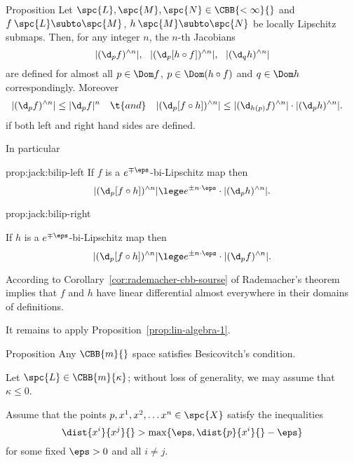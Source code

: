 \begin{thm}{Proposition}\label{prop:jack}
Let 
$\spc{L},\spc{M},\spc{N}\in\CBB{<\infty}{}$ and $f\:\spc{L}\subto\spc{M}$, $h\: \spc{M}\subto\spc{N}$
be locally Lipschitz submaps.
Then, for any integer $n$, 
the $n$-th Jacobians 
$$|(\d_p f)^{\wedge n}|,\ \  
|(\d_p [h\circ f])^{\wedge n}|,\ \  
|(\d_q h)^{\wedge n}|$$
are defined for almost all $p\in\Dom f$, $p\in\Dom (h\circ f)$ and $q\in\Dom h$ correspondingly. 
Moreover
\begin{align*}
|(\d_pf)^{\wedge n}|&\le|\d_pf|^n
& &\t{and}
&
|(\d_p[f\circ h])^{\wedge n}|
&\le|(\d_{h(p)}f)^{\wedge n}|\cdot|(\d_ph)^{\wedge n}|.
\end{align*}
if both left and right hand sides are defined.

In particular
\begin{subthm}{prop:jack:bilip-left}
If $f$ is a $e^{\mp\eps}$-bi-Lipschitz map then
\[ 
|(\d_p[f\circ h])^{\wedge n}|
\lege 
e^{\pm n\cdot\eps}\cdot|(\d_ph)^{\wedge n}|.\]
\end{subthm}
\begin{subthm}{prop:jack:bilip-right}

If $h$ is a $e^{\mp\eps}$-bi-Lipschitz map then
\[ 
|(\d_p[f\circ h])^{\wedge n}|
\lege 
e^{\pm n\cdot\eps}\cdot|(\d_pf)^{\wedge n}|.\]
\end{subthm}


\end{thm}

According to Corollary~\ref{cor:rademacher-cbb-sourse} of Rademacher's theorem
implies that $f$ and $h$ have linear differential almost everywhere in their domains of definitions. 

It remains to 
apply Proposition~\ref{prop:lin-algebra-1}.
\qeds

















\begin{thm}{Proposition}
Any $\CBB{m}{}$ space satisfies Besicovitch's condition.
\end{thm}

Let $\spc{L}\in \CBB{m}{\kappa}$;
without loss of generality, we may assume that $\kappa\le 0$.

Assume that the points $p,x^1,x^2,\dots x^n\in\spc{X}$
satisfy the inequalities
\[\dist{x^i}{x^j}{}>\max\{\eps,\dist{p}{x^i}{}-\eps\}\]
for some fixed $\eps>0$ and all $i\ne j$.

